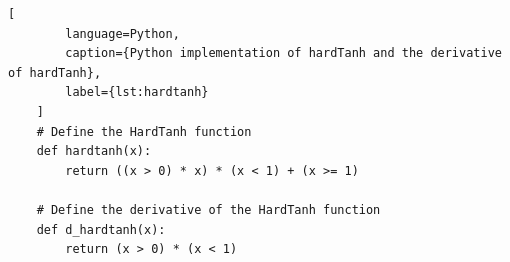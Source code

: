\begin{lstlisting}[
		language=Python, 
		caption={Python implementation of hardTanh and the derivative of hardTanh}, 
		label={lst:hardtanh}
	]
	# Define the HardTanh function
	def hardtanh(x):
		return ((x > 0) * x) * (x < 1) + (x >= 1)
	
	# Define the derivative of the HardTanh function
	def d_hardtanh(x):
		return (x > 0) * (x < 1)
\end{lstlisting}



